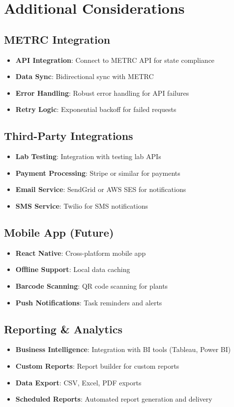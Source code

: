 \documentclass[11pt,a4paper]{article}
\begin{document}
\section{Additional Considerations}

\subsection{METRC Integration}
\begin{itemize}
    \item \textbf{API Integration}: Connect to METRC API for state compliance
    \item \textbf{Data Sync}: Bidirectional sync with METRC
    \item \textbf{Error Handling}: Robust error handling for API failures
    \item \textbf{Retry Logic}: Exponential backoff for failed requests
\end{itemize}

\subsection{Third-Party Integrations}
\begin{itemize}
    \item \textbf{Lab Testing}: Integration with testing lab APIs
    \item \textbf{Payment Processing}: Stripe or similar for payments
    \item \textbf{Email Service}: SendGrid or AWS SES for notifications
    \item \textbf{SMS Service}: Twilio for SMS notifications
\end{itemize}

\subsection{Mobile App (Future)}
\begin{itemize}
    \item \textbf{React Native}: Cross-platform mobile app
    \item \textbf{Offline Support}: Local data caching
    \item \textbf{Barcode Scanning}: QR code scanning for plants
    \item \textbf{Push Notifications}: Task reminders and alerts
\end{itemize}

\subsection{Reporting \& Analytics}
\begin{itemize}
    \item \textbf{Business Intelligence}: Integration with BI tools (Tableau, Power BI)
    \item \textbf{Custom Reports}: Report builder for custom reports
    \item \textbf{Data Export}: CSV, Excel, PDF exports
    \item \textbf{Scheduled Reports}: Automated report generation and delivery
\end{itemize}
\end{document}
